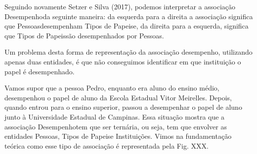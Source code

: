 \documentclass[
12pt,		%
openright,	%
twoside,  %
a4paper,			%
chapter=TITLE,		%
english,			%
french,				%
spanish,			%
brazil				%
]{USPSC-classe/USPSC}
\begin{document}

Seguindo novamente  Setzer e Silva (2017), podemos interpretar a associa\c{c}\~ao \textquotedbl Desempenho\textquotedbl  da seguinte maneira: da esquerda para a direita a associa\c{c}\~ao significa que \textquotedbl Pessoas\textquotedbl  desempenham \textquotedbl Tipos de Papeis\textquotedbl  e, da direita para a esquerda, significa que \textquotedbl Tipos de Papeis\textquotedbl  s\~ao desempenhados por \textquotedbl Pessoas\textquotedbl .














Um problema desta forma de representa\c{c}\~ao da associa\c{c}\~ao desempenho, utilizando apenas duas entidades, \'e que n\~ao conseguimos identificar em que institui\c{c}\~ao o papel \'e desempenhado.














Vamos supor que a pessoa \textquotedbl Pedro\textquotedbl , enquanto era aluno do ensino m\'edio, desempenhou o papel de aluno da Escola Estadual Vitor Meirelles. Depois, quando entrou para o ensino superior, passou a desempenhar o papel de aluno junto \`a Universidade Estadual de Campinas. Essa situa\c{c}\~ao mostra que a associa\c{c}\~ao \textquotedbl Desempenho\textquotedbl  tem que ser tern\'aria, ou seja, tem que envolver as entidades \textquotedbl Pessoas\textquotedbl , \textquotedbl Tipos de Papeis\textquotedbl  e \textquotedbl Institui\c{c}\~oes\textquotedbl . Vimos na fundamenta\c{c}\~ao te\'orica como esse tipo de associa\c{c}\~ao \'e representada pela Fig. XXX.
\end{document}
